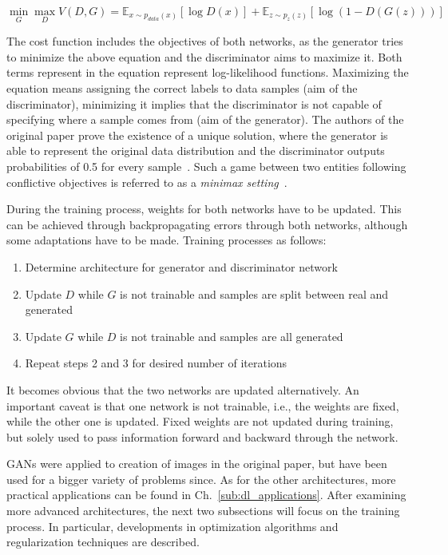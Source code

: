 \begin{equation}
  \label{eq:gan_obj}
  \min_G \max_D V(D, G) = \mathbb{E}_{x \sim p_{data}(x)}[\log D(x)] + \mathbb{E}_{z \sim p_z (z)}[\log (1 - D(G(z)))]
\end{equation}

The cost function includes the objectives of both networks, as the generator
tries to minimize the above equation and the discriminator aims to maximize it.
Both terms represent in the equation represent log-likelihood functions.
Maximizing the equation means assigning the correct labels to data samples (aim
of the discriminator), minimizing it implies that the discriminator is not capable
of specifying where a sample comes from (aim of the generator).
The authors of the original paper prove the existence of a unique solution, where
the generator is able to represent the original data distribution and the 
discriminator outputs probabilities of 0.5 for every sample~\cite{Goodfellow2014}.
Such a game between two entities following conflictive objectives is referred to
as a \textit{minimax setting}~\cite{Russell1995}.

During the training process, weights for both networks have to be updated.
This can be achieved through backpropagating errors through both networks,
although some adaptations have to be made.
Training processes as follows:

\begin{enumerate}
  \item Determine architecture for generator and discriminator network
  \item Update $D$ while $G$ is not trainable and samples are split between real and generated
  \item Update $G$ while $D$ is not trainable and samples are all generated
  \item Repeat steps 2 and 3 for desired number of iterations
\end{enumerate}

It becomes obvious that the two networks are updated alternatively.
An important caveat is that one network is not trainable, i.e., the weights are
fixed, while the other one is updated.
Fixed weights are not updated during training, but solely used to pass information
forward and backward through the network.

GANs were applied to creation of images in the original paper, but have been
used for a bigger variety of problems since. As for the other architectures,
more practical applications can be found in Ch.~\ref{sub:dl_applications}.
After examining more advanced architectures, the next two subsections will
focus on the training process.
In particular, developments in optimization algorithms and regularization
techniques are described.

